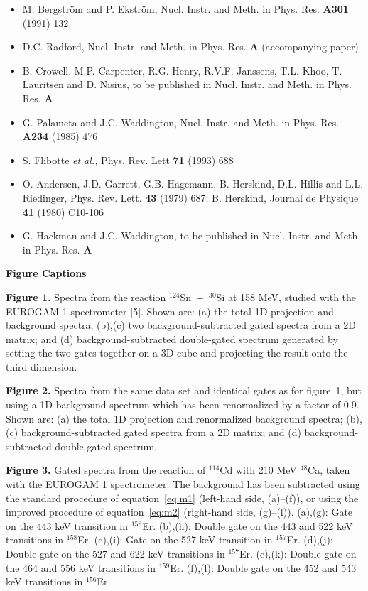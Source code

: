 \begin{itemize}
\item[{[1]}] M. Bergstr\"{o}m and P. Ekstr\"{o}m, Nucl. Instr. and Meth. in
    Phys. Res. {\bf A301} (1991) 132
\item[{[2]}] D.C. Radford, Nucl. Instr. and Meth. in Phys. Res. {\bf A}
    (accompanying paper)
\item[{[3]}] B. Crowell, M.P. Carpenter, R.G. Henry, R.V.F. Janssens,
    T.L. Khoo, T. Lauritsen and D. Nisius, to be published in Nucl. Instr. and
    Meth. in Phys. Res. {\bf A}
\item[{[4]}] G. Palameta and J.C. Waddington, Nucl. Instr. and Meth. in Phys.
    Res. {\bf A234} (1985) 476
\item[{[5]}] S. Flibotte {\em et al.,} Phys. Rev. Lett {\bf 71} (1993) 688
\item[{[6]}] O. Andersen, J.D. Garrett, G.B. Hagemann, B. Herskind, D.L. Hillis
    and L.L. Riedinger, Phys. Rev. Lett. {\bf 43} (1979) 687;
             B. Herskind, Journal de Physique {\bf 41} (1980) C10-106
\item[{[7]}] G. Hackman and J.C. Waddington, to be published in Nucl. Instr.
    and Meth. in Phys. Res. {\bf A}
\end{itemize}

\setlength{\parindent}{0mm}
\newpage
\begin{center}
{\bf                                Figure Captions}
\end{center}
\vspace{5mm}

{\bf Figure 1.}
Spectra from the reaction $^{124}$Sn~+~$^{30}$Si at 158 MeV, studied with the
EUROGAM 1 spectrometer [5]. Shown are: (a) the total 1D projection and
background spectra; (b),(c) two background-subtracted gated spectra from a 2D
matrix; and (d) background-subtracted double-gated spectrum generated by
setting the two gates together on a 3D cube and projecting the result onto the
third dimension.
\vspace{5mm}

{\bf Figure 2.} 
Spectra from the same data set and identical gates as for figure~1, but using a
1D background spectrum which has been renormalized by a factor of 0.9. Shown
are: (a) the total 1D projection and renormalized background spectra; (b),(c)
background-subtracted gated spectra from a 2D matrix; and (d)
background-subtracted double-gated spectrum.
\vspace{5mm}

{\bf Figure 3.} 
Gated spectra from the reaction of $^{114}$Cd with 210 MeV $^{48}$Ca, taken
with the EUROGAM 1 spectrometer. The background has been subtracted using the
standard procedure of equation~\ref{eq:m1} (left-hand side, (a)--(f)), or using
the improved procedure of equation~\ref{eq:m2} (right-hand side, (g)--(l)).
(a),(g): Gate on the 443 keV transition in $^{158}$Er.
(b),(h): Double gate on the 443 and 522 keV transitions in $^{158}$Er.
(c),(i): Gate on the 527 keV transition in $^{157}$Er.
(d),(j): Double gate on the 527 and 622 keV transitions in $^{157}$Er.
(e),(k): Double gate on the 464 and 556 keV transitions in $^{159}$Er.
(f),(l): Double gate on the 452 and 543 keV transitions in $^{156}$Er.
\vspace{5mm}

